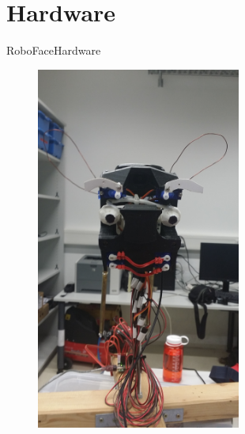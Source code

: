 \documentclass{beamer}
\begin{document}
\section{Hardware}
\begin{frame}{RoboFace}{Hardware}
	\begin{figure}
		\centering
         \includegraphics[width=0.6\textwidth,angle=270]{figures/RoboFaceNeutral.jpg}
		\label{fig:RoboFaceNeutral}
	\end{figure}
\end{frame}
\end{document}
